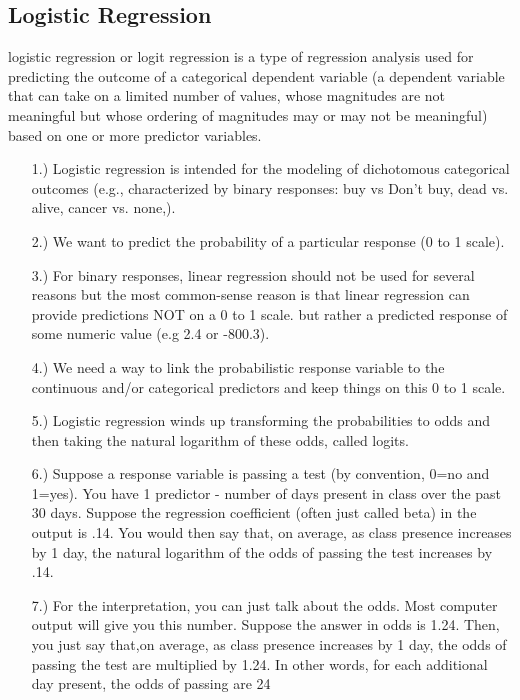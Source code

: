 \documentclass[a4paper,12pt]{article}
\begin{document}
\subsection{Logistic Regression}
logistic regression or logit regression is a type of regression analysis used for predicting
the outcome of a categorical dependent variable (a dependent variable that can take on a limited number of values,
whose magnitudes are not meaningful but whose ordering of magnitudes may or may not be meaningful)
based on one or more predictor variables.



\begin{itemize}
	\item[1.)] Logistic regression is intended for the modeling
	of dichotomous categorical outcomes (e.g., characterized by binary responses: buy vs Don't buy, dead vs. alive, cancer vs. none,).
	
	
	\item[2.)] We want to predict the probability of a particular response  (0 to 1 scale).
	
	\item[3.)] For binary responses, linear regression should not be used for several reasons
	but the most common-sense reason is that linear regression can provide predictions NOT on a 0 to 1 scale.
	but rather a predicted response of some numeric value (e.g 2.4 or -800.3).
	
	\item[4.)] We need a way to link the probabilistic response variable to the continuous and/or categorical predictors and
	keep things on this 0 to 1 scale.
	
	\item[5.)] Logistic regression winds up transforming the probabilities to odds and then taking the natural logarithm of these odds, called logits.
	
	
	\item[6.)] Suppose a response variable is passing a test (by convention, 0=no and 1=yes).
	You have 1 predictor - number of days present in class over the past 30 days.
	Suppose the regression coefficient (often just called beta) in the output is .14.
	You would then say that, on average, as class presence increases by 1 day, the natural logarithm of the
	odds of passing the test increases by .14.
	
	\item[7.)] For the interpretation, you can just talk about the odds.
	Most computer output will give you this number.
	Suppose the answer in odds is 1.24. Then, you just say that,on average, as class presence increases by 1 day,
	the odds of passing the test are multiplied by 1.24.
	In other words, for each additional day present, the odds of passing are 24%
	

\end{itemize}
\end{document}

